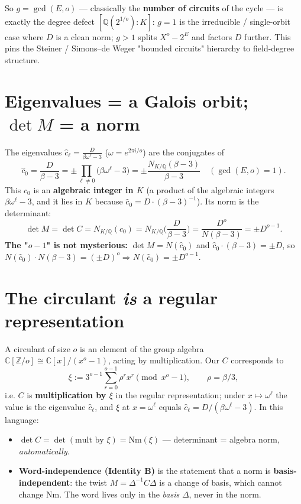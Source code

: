 \documentclass[11pt]{article}
\begin{document}
So $g=\gcd(E,o)$ --- classically the \textbf{number of circuits} of the cycle --- is exactly the degree defect $[\mathbb Q(2^{1/o}):K]$: $g=1$ is the irreducible / single-orbit case where $D$ is a clean norm; $g > 1$ splits $X^o-2^E$ and factors $D$ further. This pins the Steiner / Simons--de Weger "bounded circuits" hierarchy to field-degree structure.

\section{Eigenvalues = a Galois orbit; $\det M$ = a norm}

The eigenvalues $\hat c_\ell=\frac{D}{\beta\omega^\ell-3}$ ($\omega=e^{2\pi i/o}$) are the conjugates of
\[
\hat c_0=\frac{D}{\beta-3}=\pm\prod_{\ell\neq 0}\big(\beta\omega^\ell-3\big) = \pm\frac{N_{K/\mathbb Q}(\beta-3)}{\beta-3} \quad (\gcd(E,o)=1).
\]
This $\hat c_0$ is an \textbf{algebraic integer in $K$} (a product of the algebraic integers $\beta\omega^\ell-3$, and it lies in $K$ because $\hat c_0=D\cdot(\beta-3)^{-1}$). Its norm is the determinant:
\[
\det M = \det C = N_{K/\mathbb Q}(\hat c_0) = N_{K/\mathbb Q}\Big(\frac{D}{\beta-3}\Big) = \frac{D^{o}}{N(\beta-3)} = \pm D^{o-1}.
\]
\textbf{The "$o-1$" is not mysterious:} $\det M=N(\hat c_0)$ and $\hat c_0\cdot(\beta-3)=\pm D$, so $N(\hat c_0)\cdot N(\beta-3)=(\pm D)^{o} \Rightarrow N(\hat c_0)=\pm D^{o-1}$.

\section{The circulant \textit{is} a regular representation}

A circulant of size $o$ is an element of the group algebra $\mathbb C[\mathbb Z/o]\cong\mathbb C[x]/(x^{o}-1)$, acting by multiplication. Our $C$ corresponds to
\[
\xi:=3^{o-1}\sum_{r=0}^{o-1}\rho^{r}x^{r} \pmod{x^{o}-1}, \qquad \rho=\beta/3,
\]
i.e. $C$ is \textbf{multiplication by $\xi$} in the regular representation; under $x\mapsto\omega^\ell$ the value is the eigenvalue $\hat c_\ell$, and $\xi$ at $x=\omega^\ell$ equals $\hat c_\ell=D/(\beta\omega^\ell-3)$. In this language:
\begin{itemize}
    \item $\det C = \det(\text{mult by } \xi) = \mathrm{Nm}(\xi)$ --- determinant = algebra norm, \textit{automatically}.
    \item \textbf{Word-independence (Identity B)} is the statement that a norm is \textbf{basis-independent}: the twist $M=\Delta^{-1}C\Delta$ is a change of basis, which cannot change $\mathrm{Nm}$. The word lives only in the \textit{basis} $\Delta$, never in the norm.
\end{itemize}
\end{document}
